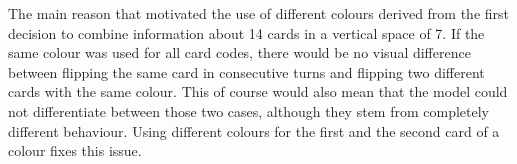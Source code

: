 
The main reason that motivated the use of different colours derived from the first decision to combine information about 14 cards in a vertical space of 7. If the same colour was used for all card codes, there would be no visual difference between flipping the same card in consecutive turns and flipping two different cards with the same colour. This of course would also mean that the model could not differentiate between those two cases, although they stem from completely different behaviour. Using different colours for the first and the second card of a colour fixes this issue.

